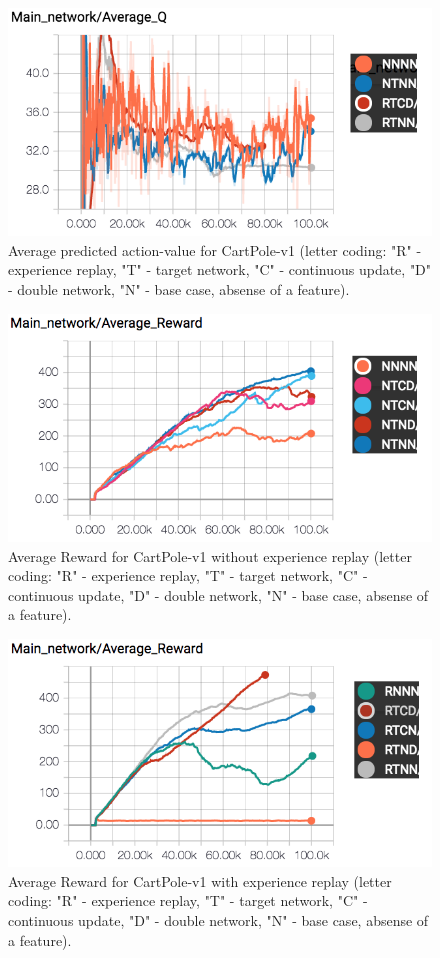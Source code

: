 \documentclass{article}
\begin{document}
\begin{figure}[h]
    \centering
    \includegraphics[width=\textwidth]{QPlotFixed}
    \caption{Average predicted action-value for CartPole-v1 (letter coding: "R" - experience replay, "T" - target network, "C" - continuous update, "D" - double network, "N" - base case, absense of a feature).}
\end{figure}

\begin{figure}[h]
    \centering
    \includegraphics[width=\textwidth]{BPlotFixed}
    \caption{Average Reward for CartPole-v1 without experience replay (letter coding: "R" - experience replay, "T" - target network, "C" - continuous update, "D" - double network, "N" - base case, absense of a feature).}
\end{figure}

\begin{figure}[h]
    \centering
    \includegraphics[width=\textwidth]{RPlotFixed}
    \caption{Average Reward for CartPole-v1 with experience replay (letter coding: "R" - experience replay, "T" - target network, "C" - continuous update, "D" - double network, "N" - base case, absense of a feature).}
\end{figure}
\end{document}
